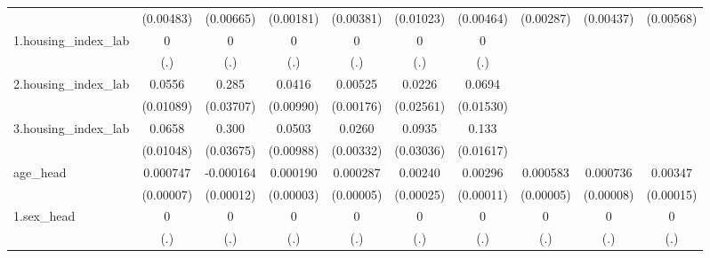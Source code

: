 \begin{table}[htbp]
\begin{tabular}{l*{9}{c}}
            &   (0.00483)         &   (0.00665)         &   (0.00181)         &   (0.00381)         &   (0.01023)         &   (0.00464)         &   (0.00287)         &   (0.00437)         &   (0.00568)         \\
1.housing\_index\_lab&           0         &           0         &           0         &           0         &           0         &           0         &                     &                     &                     \\
            &         (.)         &         (.)         &         (.)         &         (.)         &         (.)         &         (.)         &                     &                     &                     \\
2.housing\_index\_lab&      0.0556\sym{***}&       0.285\sym{***}&      0.0416\sym{***}&     0.00525\sym{***}&      0.0226         &      0.0694\sym{***}&                     &                     &                     \\
            &   (0.01089)         &   (0.03707)         &   (0.00990)         &   (0.00176)         &   (0.02561)         &   (0.01530)         &                     &                     &                     \\
3.housing\_index\_lab&      0.0658\sym{***}&       0.300\sym{***}&      0.0503\sym{***}&      0.0260\sym{***}&      0.0935\sym{***}&       0.133\sym{***}&                     &                     &                     \\
            &   (0.01048)         &   (0.03675)         &   (0.00988)         &   (0.00332)         &   (0.03036)         &   (0.01617)         &                     &                     &                     \\
age\_head    &    0.000747\sym{***}&   -0.000164         &    0.000190\sym{***}&    0.000287\sym{***}&     0.00240\sym{***}&     0.00296\sym{***}&    0.000583\sym{***}&    0.000736\sym{***}&     0.00347\sym{***}\\
            &   (0.00007)         &   (0.00012)         &   (0.00003)         &   (0.00005)         &   (0.00025)         &   (0.00011)         &   (0.00005)         &   (0.00008)         &   (0.00015)         \\
1.sex\_head  &           0         &           0         &           0         &           0         &           0         &           0         &           0         &           0         &           0         \\
            &         (.)         &         (.)         &         (.)         &         (.)         &         (.)         &         (.)         &         (.)         &         (.)         &         (.)         \\

\end{tabular}
\end{table}
